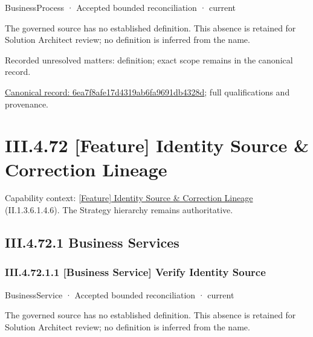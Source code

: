 \label{element:6ea7f8afe17d4319ab6fa9691db4328d}
{\small BusinessProcess · Accepted bounded reconciliation · current}\par

The governed source has no established definition. This absence is retained for Solution Architect review; no definition is inferred from the name.


{\small Recorded unresolved matters: definition; exact scope remains in the canonical record.}\par
{\footnotesize \href{../../../../continuum/business/business-process/6ea7f8afe17d4319ab6fa9691db4328d.md}{Canonical record: 6ea7f8afe17d4319ab6fa9691db4328d}; full qualifications and provenance.}\par
\section*{III.4.72 [Feature] Identity Source \& Correction Lineage}
\label{navigation:III.4.72}

{\small Capability context: \hyperref[element:d72134e75001449a9e7ffae53f61458f]{[Feature] Identity Source \& Correction Lineage} (II.1.3.6.1.4.6). The Strategy hierarchy remains authoritative.}\par
\subsection*{III.4.72.1 Business Services}
\label{navigation:III.4.72.1}

\subsubsection*{III.4.72.1.1 [Business Service] Verify Identity Source}
\label{navigation:III.4.72.1.1}

\label{element:b95f652107f4420b86cc10fb893c9b01}
{\small BusinessService · Accepted bounded reconciliation · current}\par

The governed source has no established definition. This absence is retained for Solution Architect review; no definition is inferred from the name.


